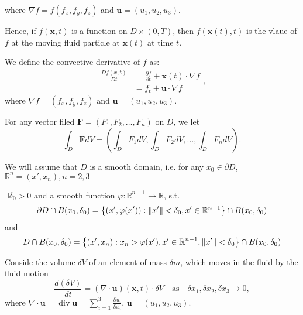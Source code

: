 where $\nabla f = f(f_x,f_y,f_z)$ and $\textbf{u}=(u_1,u_2,u_3)$.

Hence, if $f(\textbf{x},t)$ is a function on $D\times(0,T)$, then $f(\textbf{x}(t),t)$ is the vlaue of $f$ at the moving fluid particle at $\textbf{x}(t)$ at time $t$.

We define the convective derivative of $f$ as:
\begin{equation}
\begin{aligned}
\frac{Df(x,t)}{Dt}
&= \frac{\partial f}{\partial t} + \dot{\textbf{x}}(t)\cdot \nabla f\\
&= f_t + \textbf{u} \cdot \nabla f
\end{aligned},
\end{equation}
 where $\nabla f = (f_x,f_y,f_z)$ and $\textbf{u} = (u_1,u_2,u_3)$.


For any vector filed $\textbf{F} = (F_1,F_2,\ldots,F_n)$ on $D$, we let
\begin{equation}
\int_{D} \textbf{F}dV = \left(\int_{D} F_1dV, \int_{D} F_2dV,\ldots,\int_{D} F_ndV\right).
\end{equation}



We will assume that $D$ is a smooth domain, i.e. for any $x_0 \in \partial D$, $\mathbb{R}^{n} = (x',x_n), n=2,3$

$\exists \delta_0 > 0$ and a smooth function $\varphi:\mathbb{R}^{n-1}\to\mathbb{R}$, s.t.
\begin{equation}
\partial D\cap B(x_0,\delta_0)=\left\{(x',\varphi(x')) : \norm{x'}<\delta_0, x'\in\mathbb{R}^{n-1}\right\} \cap B(x_0,\delta_0)
\end{equation}
and
\begin{equation}
D\cap B({x_0,\delta_0}) = \left\{(x',x_n) : x_n>\varphi(x'), x'\in\mathbb{R}^{n-1}, \norm{x'}<\delta_0\right\} \cap B(x_0,\delta_0)
\end{equation}



Conside the volume $\delta V$ of an element of mass $\delta m$, which moves in the fluid by the fluid motion
\begin{equation}
\frac{d(\delta V)}{dt} = (\nabla \cdot \textbf{u}) (\textbf{x},t)\cdot \delta V\quad\text{as}\quad \delta x_1, \delta x_2, \delta x_3 \to 0,
\end{equation}
 where $\displaystyle \nabla\cdot\textbf{u} = \operatorname{div}\textbf{u} = \sum_{i=1}^{3}\frac{\partial u_i}{\partial x_i}$, $\textbf{u} = (u_1,u_2,u_3)$.

